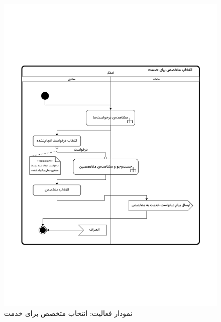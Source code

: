 \begin{figure}[ht!]
	\centering
	\includegraphics[scale=0.8, page=1]{figs/OOD-activity-selectspecreq.pdf}
	\caption{نمودار فعالیت: انتخاب متخصص برای خدمت}
\end{figure}
\FloatBarrier
\newpage


